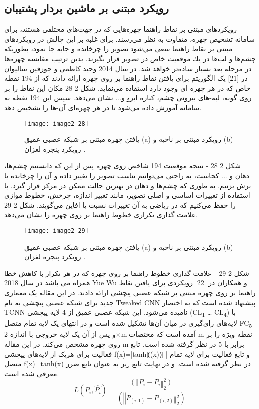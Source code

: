  \subsection{رویکرد مبتنی بر ماشین بردار پشتیبان}
	رویکردهای مبتنی بر نقاط راهنما 
چهره‌هايى كه در جهت‌هاى مختلفى هستند، براى سامانه تشخیص چهره، متفاوت به نظر مي‌رسند. براى غلبه بر اين چالش در رویکردهای مبتنی بر نقاط راهنما سعى مي‌شود تصوير را چرخانده و جابه جا نمود، بطوريكه چشم‌ها و لب‌ها در يك موقعيت خاص در تصوير قرار بگیرند. بدین ترتیب مقايسه چهره‌ها در مرحله بعد بسيار ساده‌تر خواهد شد. 
در سال 2014 وحيد كاظمى و جوزفين ساليوان در [21] یک الگوریتم برای یافتن نقاط راهنما بر روی چهره ارائه دادند كه از 194 نقطه خاص كه در هر چهره اى وجود دارد استفاده مي‌نماید. شکل 2-28 مکان این نقاط را بر روی گونه، لبه-هاى بیرونی چشم، كناره ابرو و... نشان می‌دهد. سپس اين 194 نقطه به سامانه آموزش داده می‌شود تا در هر چهره‌اى آن-ها را تشخيص دهد. 
 
 \begin{figure}[h]
\centering
  \texttt{[image: image2-28]}
  \caption{یافتن چهره مبتنی بر شبکه عصبی عمیق (a) رویکرد مبتنی بر ناحیه و (b) رویکرد پنجره لغزان \cite{ref1}.}
  \label{image2-28}
\end{figure}

شکل ‏2 28 - نتیجه موقعیت 194 شاخص روی چهره
پس از این که دانستیم چشم‌ها، دهان و ... کجاست، به راحتی می‌توانیم تناسب تصویر را تغییر داده و آن را چرخانده یا برش بزنیم. به طوری که چشم‌ها و دهان در بهترین حالت ممکن در مرکز قرار گیرد. با استفاده از تغییرات اساسی و اصلی تصویر، مانند تغییر اندازه، چرخش، خطوط موازی را حفظ می‌کنیم که در ریاضی به آن تغییرات نسبت یا افاین می‌گویند. شکل 2-29 علامت گذاری تکراری خطوط راهنما بر روی چهره را نشان می‌دهد.
 
 \begin{figure}[h]
\centering
  \texttt{[image: image2-29]}
  \caption{یافتن چهره مبتنی بر شبکه عصبی عمیق (a) رویکرد مبتنی بر ناحیه و (b) رویکرد پنجره لغزان \cite{ref1}.}
  \label{image2-29}
\end{figure}

شکل ‏2 29 - علامت گذاری خطوط راهنما بر روی چهره که در هر تکرار با کاهش خطا همراه می باشد
در سال 2018 Yue Wu و همکاران در [22] رویکردی برای یافتن نقاط راهنما بر روی چهره مبتنی بر شبکه عصبی پیچشی ارائه دادند. در این مقاله یک معماری جدید برای شبکه عصبی پیچشی به نام Tweaked CNN پیشنهاد شده است که به اختصار TCNN نامیده می‌شود. این شبکه عصبی عمیق از 4 لایه پیچشی
(CL\textsubscript{1} … CL\textsubscript{4})
با لایه‌های رای‌گیری در میان آن‌ها تشکیل شده است و در انتهای یک لایه تمام متصل
FC\textsubscript{5}
و پس از آن یک لایه خروجی با اندازه 2×m آمده است که مختصات m نقطه ویژه را بر روی چهره مشخص می‌کند. در این مقاله m برابر با 5 در نظر گرفته شده است. تابع فعالیت برای هریک از لایه‌های پیچشی f(x)=|tanh⁡〖(x)〗 | و تابع فعالیت برای لایه تمام متصل
f(x)=tanh⁡(x)
در نظر گرفته شده است. و در نهایت تابع زیر به عنوان تابع ضرر معرفی شده است.
\begin{equation}\label{eq2-12}
L(P_i,\hat{P_i})=\frac{(‖P_i-P ̂_i ‖_2^2)}{(‖P ̂_(i,1)-P ̂_(i,2) ‖_2^2 )}	
\end{equation}

